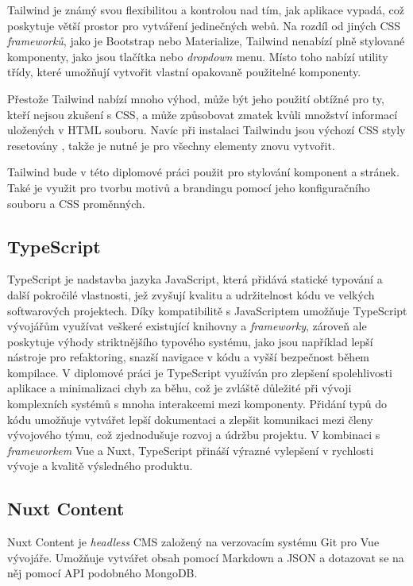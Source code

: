 Tailwind je známý svou flexibilitou a kontrolou nad tím, jak aplikace vypadá, což poskytuje větší prostor pro vytváření jedinečných webů. Na rozdíl od jiných CSS \emph{frameworků}, jako je Bootstrap nebo Materialize, Tailwind nenabízí plně stylované komponenty, jako jsou tlačítka nebo \emph{dropdown} menu. Místo toho nabízí utility třídy, které umožňují vytvořit vlastní opakovaně použitelné komponenty.

Přestože Tailwind nabízí mnoho výhod, může být jeho použití obtížné pro ty, kteří nejsou zkušení s CSS, a může způsobovat zmatek kvůli množství informací uložených v HTML souboru. Navíc při instalaci Tailwindu jsou výchozí CSS styly resetovány \cite{TailwindPreflight}, takže je nutné je pro všechny elementy znovu vytvořit.

Tailwind bude v této diplomové práci použit pro stylování komponent a stránek. Také je využit pro tvorbu motivů a brandingu pomocí jeho konfiguračního souboru a CSS proměnných.

\subsection{TypeScript}
TypeScript je nadstavba jazyka JavaScript, která přidává statické typování a další pokročilé vlastnosti, jež zvyšují kvalitu a udržitelnost kódu ve velkých softwarových projektech. Díky kompatibilitě s JavaScriptem umožňuje TypeScript vývojářům využívat veškeré existující knihovny a \emph{frameworky}, zároveň ale poskytuje výhody striktnějšího typového systému, jako jsou například lepší nástroje pro refaktoring, snazší navigace v kódu a vyšší bezpečnost během kompilace. V diplomové práci je TypeScript využíván pro zlepšení spolehlivosti aplikace a minimalizaci chyb za běhu, což je zvláště důležité při vývoji komplexních systémů s mnoha interakcemi mezi komponenty. Přidání typů do kódu umožňuje vytvářet lepší dokumentaci a zlepšit komunikaci mezi členy vývojového týmu, což zjednodušuje rozvoj a údržbu projektu. V kombinaci s \emph{frameworkem} Vue a Nuxt, TypeScript přináší výrazné vylepšení v rychlosti vývoje a kvalitě výsledného produktu. \cite{TypeScript}


\subsection{Nuxt Content}
Nuxt Content je \emph{headless} CMS založený na verzovacím systému Git pro Vue vývojáře. Umožňuje vytvářet obsah pomocí Markdown a JSON a dotazovat se na něj pomocí API podobného MongoDB. \cite{NuxtContent}

